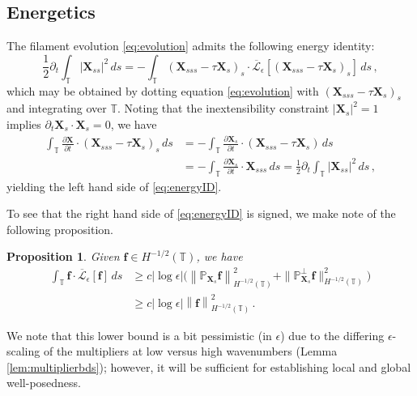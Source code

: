 \documentclass[11pt,reqno]{amsart}
\newcommand{\T}{\mathbb{T}}
\renewcommand{\P}{\mathbb{P}}
\newcommand{\X}{\bm{X}}
\newcommand{\p}{\partial}
\newcommand{\abs}[1]{\left\lvert #1 \right\rvert}
\newcommand{\norm}[1]{\left\lVert #1 \right\rVert}
\newcommand{\mc}[1]{\mathcal{#1}}
\numberwithin{equation}{section}
\newtheorem{proposition}[theorem]{Proposition}
\theoremstyle{definition}
\begin{document}
\subsection{Energetics}\label{subsec:energetics}
The filament evolution \eqref{eq:evolution} admits the following energy identity: 
\begin{equation}\label{eq:energyID}
\frac{1}{2}\p_t\int_\T \abs{\X_{ss}}^2\,ds = -\int_{\T}(\X_{sss}-\tau\X_s)_s\cdot\overline{\mc{L}}_\epsilon[(\X_{sss}-\tau\X_s)_s]\,ds\,,
\end{equation}
which may be obtained by dotting equation \eqref{eq:evolution} with $(\X_{sss}-\tau\X_s)_s$ and integrating over $\T$. Noting that the inextensibility constraint $\abs{\X_s}^2=1$ implies $\p_t\X_s\cdot\X_s=0$, we have  
\begin{equation}
\begin{aligned}
  \int_\T\frac{\p\X}{\p t}\cdot(\X_{sss}-\tau\X_s)_s\,ds &= -\int_\T\frac{\p\X_s}{\p t}\cdot(\X_{sss}-\tau\X_s)\,ds\\
  &= -\int_\T\frac{\p\X_s}{\p t}\cdot\X_{sss}\,ds = \frac{1}{2}\p_t\int_\T \abs{\X_{ss}}^2\,ds\,,
\end{aligned}
\end{equation}
yielding the left hand side of \eqref{eq:energyID}.


To see that the right hand side of \eqref{eq:energyID} is signed, we make note of the following proposition. 
%
\begin{proposition}\label{prop:positivity}
  Given $\bm{f}\in H^{-1/2}(\T)$, we have 
  \begin{equation}
  \begin{aligned}
    \int_\T \bm{f}\cdot\overline{\mc{L}}_\epsilon[\bm{f}]\,ds &\ge c\abs{\log\epsilon}\big(\norm{\P_{\X_s}\bm{f}}_{H^{-1/2}(\T)}^2 + \|\P_{\X_s}^\perp\bm{f}\|_{H^{-1/2}(\T)}^2\big)\\
    &\ge c\abs{\log\epsilon}\norm{\bm{f}}_{H^{-1/2}(\T)}^2 \,.
  \end{aligned}
  \end{equation}
\end{proposition}
We note that this lower bound is a bit pessimistic (in $\epsilon$) due to the differing $\epsilon$-scaling of the multipliers at low versus high wavenumbers (Lemma \ref{lem:multiplierbds}); however, it will be sufficient for establishing local and global well-posedness. 
\end{document}
